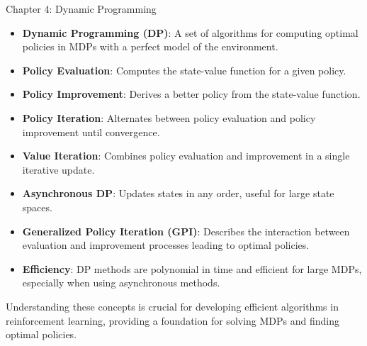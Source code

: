 \begin{notes}{Chapter 4: Dynamic Programming}
\begin{highlight}
    \end{highlight}
    
    \begin{highlight}
    
        \begin{itemize}
            \item \textbf{Dynamic Programming (DP)}: A set of algorithms for computing optimal policies in MDPs with a perfect model of the environment.
            \item \textbf{Policy Evaluation}: Computes the state-value function for a given policy.
            \item \textbf{Policy Improvement}: Derives a better policy from the state-value function.
            \item \textbf{Policy Iteration}: Alternates between policy evaluation and policy improvement until convergence.
            \item \textbf{Value Iteration}: Combines policy evaluation and improvement in a single iterative update.
            \item \textbf{Asynchronous DP}: Updates states in any order, useful for large state spaces.
            \item \textbf{Generalized Policy Iteration (GPI)}: Describes the interaction between evaluation and improvement processes leading to optimal policies.
            \item \textbf{Efficiency}: DP methods are polynomial in time and efficient for large MDPs, especially when using asynchronous methods.
        \end{itemize}
    
        Understanding these concepts is crucial for developing efficient algorithms in reinforcement learning, providing a foundation for solving MDPs and finding optimal policies.
    
    \end{highlight}
\end{notes}